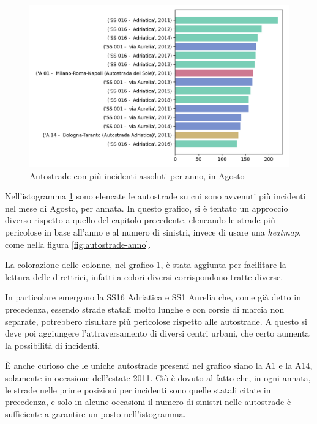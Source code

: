 \documentclass[a4paper]{report}
\newcommand{\quotestyle}[1]{\textit{#1}}
\begin{document}
\begin{figure}
    \includegraphics[width=\linewidth]{../src/incidenti/incidenti_aci/agosto/autostrade_anno_agosto.png}
    \caption{Autostrade con più incidenti assoluti per anno, in Agosto}
    \label{fig:autostrade-anno-agosto}
\end{figure}

Nell'istogramma \ref{fig:autostrade-anno-agosto} sono elencate le 
autostrade su cui sono avvenuti più incidenti nel mese di Agosto, per annata. 
In questo grafico, si è tentato un approccio diverso rispetto a quello del capitolo 
precedente, elencando le strade più pericolose in base all'anno e al numero di sinistri, 
invece di usare una 
\quotestyle{heatmap}, come nella figura \ref{fig:autostrade-anno}. 

La colorazione delle colonne, nel grafico \ref{fig:autostrade-anno-agosto}, è stata aggiunta per 
facilitare la lettura delle direttrici, infatti a colori diversi corrispondono tratte diverse. 

In particolare emergono la SS16 Adriatica e SS1 Aurelia che, come già 
detto in precedenza, essendo strade statali molto lunghe e con corsie di marcia 
non separate, potrebbero risultare più pericolose rispetto alle autostrade. 
A questo si deve poi aggiungere l'attraversamento di diversi centri urbani, 
che certo aumenta la possibilità di incidenti. 

\`E anche curioso che le uniche autostrade presenti nel grafico siano la A1 e la A14, 
solamente in occasione dell'estate 2011. 
Ciò è dovuto al fatto che, in ogni annata, le strade nelle prime posizioni per incidenti sono 
quelle statali citate in precedenza, e solo in alcune occasioni il numero di sinistri 
nelle autostrade è sufficiente a garantire un posto nell'istogramma. 
\end{document}
